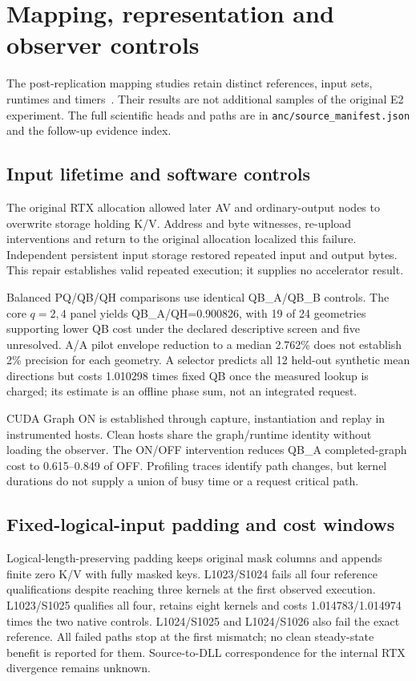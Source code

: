 \section{Mapping, representation and observer controls}
\label{supp:followupmapping}
The post-replication mapping studies retain distinct references, input sets, runtimes and timers~\cite{mappingrecords,b570compactrecords}. Their results are not additional samples of the original E2 experiment. The full scientific heads and paths are in \texttt{anc/source\_manifest.json} and the follow-up evidence index.

\subsection{Input lifetime and software controls}
The original RTX allocation allowed later AV and ordinary-output nodes to overwrite storage holding K/V. Address and byte witnesses, re-upload interventions and return to the original allocation localized this failure. Independent persistent input storage restored repeated input and output bytes. This repair establishes valid repeated execution; it supplies no accelerator result.

Balanced PQ/QB/QH comparisons use identical QB\_A/QB\_B controls. The core $q=2,4$ panel yields QB\_A/QH=0.900826, with 19 of 24 geometries supporting lower QB cost under the declared descriptive screen and five unresolved. A/A pilot envelope reduction to a median 2.762\% does not establish 2\% precision for each geometry. A selector predicts all 12 held-out synthetic mean directions but costs 1.010298 times fixed QB once the measured lookup is charged; its estimate is an offline phase sum, not an integrated request.

CUDA Graph ON is established through capture, instantiation and replay in instrumented hosts. Clean hosts share the graph/runtime identity without loading the observer. The ON/OFF intervention reduces QB\_A completed-graph cost to 0.615--0.849 of OFF. Profiling traces identify path changes, but kernel durations do not supply a union of busy time or a request critical path.

\subsection{Fixed-logical-input padding and cost windows}
Logical-length-preserving padding keeps original mask columns and appends finite zero K/V with fully masked keys. L1023/S1024 fails all four reference qualifications despite reaching three kernels at the first observed execution. L1023/S1025 qualifies all four, retains eight kernels and costs 1.014783/1.014974 times the two native controls. L1024/S1025 and L1024/S1026 also fail the exact reference. All failed paths stop at the first mismatch; no clean steady-state benefit is reported for them. Source-to-DLL correspondence for the internal RTX divergence remains unknown.

